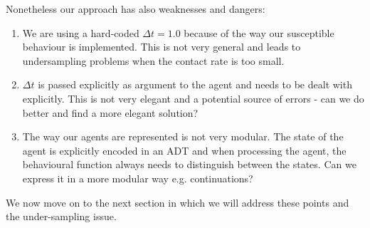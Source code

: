 Nonetheless our approach has also weaknesses and dangers:
\begin{enumerate}
	\item We are using a hard-coded $\Delta t = 1.0$ because of the way our susceptible behaviour is implemented. This is not very general and leads to undersampling problems when the contact rate is too small.
	\item $\Delta t$ is passed explicitly as argument to the agent and needs to be dealt with explicitly. This is not very elegant and a potential source of errors - can we do better and find a more elegant solution? 
	\item The way our agents are represented is not very modular. The state of the agent is explicitly encoded in an ADT and when processing the agent, the behavioural function always needs to distinguish between the states. Can we express it in a more modular way e.g. continuations?
\end{enumerate}

We now move on to the next section in which we will address these points and the under-sampling issue.